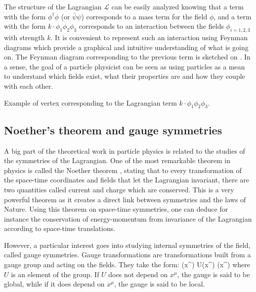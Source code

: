     The structure of the Lagrangian $\mathcal{L}$ can be easily analyzed knowing that
    a term with the form $\phi^\dagger \phi$ (or $\bar{\psi}\psi$) corresponds to a mass term for the field $\phi$,
    and a term with the form $k \cdot \phi_1 \phi_2 \phi_3$ corresponds to an interaction
    between the fields $\phi_{i=1,2,3}$ with strength $k$. It is convenient to
    represent such an interaction using Feynman diagrams which provide a graphical and
    intuitive understanding of what is going on. The Feynman diagram corresponding to the
    previous term is sketched on . In a sense, the
    goal of a particle physicist can be seen as using particles as a mean to understand
    which fields exist, what their properties are and how they couple with each other.

                 {Example of vertex corresponding to the Lagrangian term
                 $k \cdot \phi_1 \phi_2 \phi_3$.}

        \subsection{Noether's theorem and gauge symmetries}

    A big part of the theoretical work in particle physics is related to the studies of
    the symmetries of the Lagrangian. One of the most remarkable theorem in physics is
    called the Noether theorem \cite{Noether}, stating that to every transformation of the space-time
    coordinates and fields that let the Lagrangian invariant, there are two quantities
    called current and charge which are conserved. This is a very powerful theorem as it
    creates a direct link between symmetries and the laws of Nature. Using this theorem on
    space-time symmetries, one can deduce for instance the conservation of energy-momentum
    from invariance of the Lagrangian according to space-time translations.

    However, a particular interest goes into studying internal symmetries of the field,
    called gauge symmetries. Gauge transformations are transformations built from a gauge
    group and acting on the fields. They take the form:
    {
        \psi(x^\mu)
        \rightarrow
        U(x^\mu) \psi(x^\mu)
    }
    where $U$ is an element of the group. If $U$ does not depend on $x^\mu$, the gauge is
    said to be global, while if it does depend on $x^\mu$, the gauge is said to be local.

